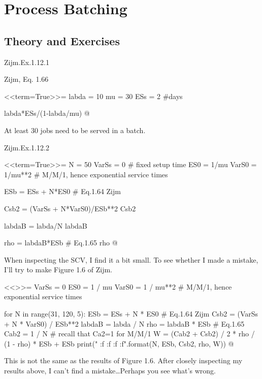 \section{Process Batching}
\label{sec:process-batching}


\subsection*{Theory and Exercises}



\begin{exercise}
Zijm.Ex.1.12.1
 \begin{solution}
Zijm, Eq. 1.66

<<term=True>>=
labda = 10
mu = 30
ESs = 2 #days

labda*ESs/(1-labda/mu)
@

At least 30 jobs need to be served in a batch.
\end{solution}
\end{exercise}

\begin{exercise}
Zijm.Ex.1.12.2
 \begin{solution}

<<term=True>>=
N = 50
VarSs = 0 # fixed setup time
ES0 = 1/mu
VarS0 = 1/mu**2 # M/M/1, hence exponential service times

ESb = ESs + N*ES0 # Eq.1.64 Zijm

Csb2 = (VarSs + N*VarS0)/ESb**2 
Csb2

labdaB = labda/N
labdaB


rho = labdaB*ESb # Eq.1.65
rho 
@

When inspecting the SCV, I find it a bit small. To see whether I made a mistake, I'll try to make Figure 1.6 of Zijm.

<<>>=
VarSs = 0
ES0 = 1 / mu
VarS0 = 1 / mu**2  # M/M/1, hence exponential service times

for N in range(31, 120, 5):
    ESb = ESs + N * ES0  # Eq.1.64 Zijm
    Csb2 = (VarSs + N * VarS0) / ESb**2
    labdaB = labda / N
    rho = labdaB * ESb  # Eq.1.65
    Cab2 = 1 / N  # recall that Ca2=1 for M/M/1
    W = (Cab2 + Csb2) / 2 * rho / (1 - rho) * ESb + ESb
    print("{} {:f} {:f} {:f} {:f}".format(N, ESb, Csb2, rho, W))
@

This is not the same as the results of Figure 1.6. After closely
inspecting my results above, I can't find a mistake\ldots Perhaps you see what's wrong.
\end{solution}
\end{exercise}

